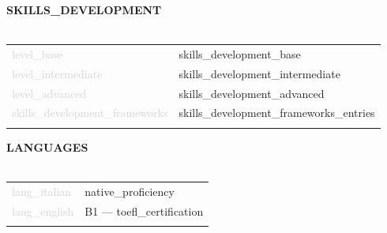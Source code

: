 \documentclass{article}
\begin{document}
\textbf{\textcolor{deepblue}{\uppercase{{{skills_development}}}}} \\\\ \hfill
\begin{tabular}{ R{4cm} L{11cm} }
	\textcolor{lightgray}{{{level_base}}} & {{skills_development_base}} \\ \hfill
	\textcolor{lightgray}{{{level_intermediate}}} & {{skills_development_intermediate}} \\ \hfill
	\textcolor{lightgray}{{{level_advanced}}} & {{skills_development_advanced}} \\[.5cm] \hfill
	\textcolor{lightgray}{{{skills_development_frameworks}}} & {{skills_development_frameworks_entries}} \\ \hfill
\end{tabular}

\textbf{\textcolor{deepblue}{\uppercase{{{languages}}}}} \\\\ \hfill
\begin{tabular}{ R{4cm} L{11cm} }
	\textcolor{lightgray}{{{lang_italian}}} & {{native_proficiency}} \\ \hfill
	\textcolor{lightgray}{{{lang_english}}} & B1 — {{toefl_certification}}\\ \hfill
\end{tabular}
\end{document}
